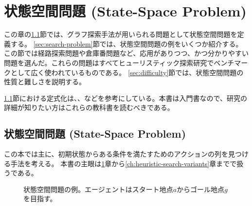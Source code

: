 
\chapter{状態空間問題 (State-Space Problem)}
\label{ch:state-space-problem}

この章の\ref{sec:state-space-problem}節では、グラフ探索手法が用いられる問題として状態空間問題を定義する。
\ref{sec:search-problem}節では、状態空間問題の例をいくつか紹介する。この節では経路探索問題や倉庫番問題など、応用がありつつ、かつ分かりやすい問題を選んだ。これらの問題はすべてヒューリスティック探索研究でベンチマークとして広く使われているものである。
\ref{sec:difficulty}節では、状態空間問題の性質と難しさを説明する。

\ref{sec:state-space-problem}節における定式化は\cite{russelln03}、\cite{pearl84}、\cite{edelkamp:2010:hst:1875144}などを参考にしている。本書は入門書なので、研究の詳細が知りたい方はこれらの教科書を読むべきである。


\section{状態空間問題 (State-Space Problem)}
\label{sec:state-space-problem}

この本では主に、初期状態からある条件を満たすためのアクションの列を見つける手法を考える。
本書の主眼は\ref{ch:state-space-problem}章から\ref{ch:heuristic-search-variants}章までで扱うである。



\begin{figure}[htb]
  \centering
  \begin{tikzpicture}[scale=0.5]
    
  \end{tikzpicture}
  \caption{状態空間問題の例。エージェントはスタート地点$a$からゴール地点$g$を目指す。
  }
  \label{fig:ssp-graph}
\end{figure}


